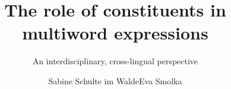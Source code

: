 \renewcommand{\lsSeries}{pmwe}
\renewcommand{\lsSeriesNumber}{4}

\title{The role of constituents in multiword expressions}
\subtitle{An interdisciplinary, cross-lingual perspective}
\author{Sabine Schulte im Walde\lastand Eva Smolka}
 
